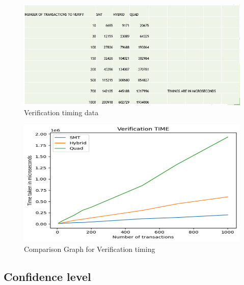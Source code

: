 \begin{figure}[H]
    \centering
    \includegraphics[scale=0.8]{figures/verification time of Tree.png}
    \caption{Verification timing data}
 
\end{figure}
\vspace{0.5cm}

\vspace{0.5cm}
\begin{figure}[H]
    \centering
    \includegraphics[scale=0.6]{figures/Comparison Graph for Verification.png}
    \caption{Comparison Graph for Verification timing}
 
\end{figure}
\vspace{0.5cm}



\subsection{Confidence level}

